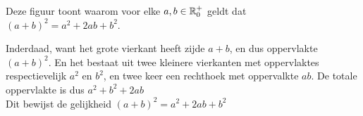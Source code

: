 \documentclass{ximera}
\begin{document}
\begin{Uitbreiding}
\begin{exercise}
\begin{image}[\width]
\end{image}


\begin{uitkomst}
Deze figuur toont waarom voor elke $a,b \in \mathbb{R}^+_0$ geldt dat $(a+b)^2 = a^2 + 2ab + b^2$.

Inderdaad, want het grote vierkant heeft zijde $a+b$, en dus oppervlakte $(a+b)^2$. 
En het bestaat uit twee kleinere vierkanten met oppervlaktes respectievelijk $a^2$ en $b^2$, en twee keer een rechthoek met oppervalkte $ab$.
De totale oppervlakte is dus $a^2+b^2+2ab$
\\
Dit bewijst de gelijkheid $(a+b)^2 = a^2 + 2ab + b^2$
\end{uitkomst}

\end{exercise}
\end{Uitbreiding}

\end{document}
